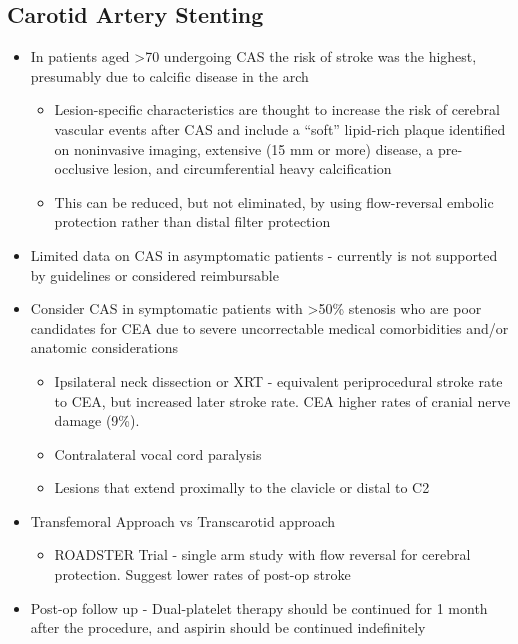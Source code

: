 \documentclass[
]{book}
\providecommand{\tightlist}{%
  \setlength{\itemsep}{0pt}\setlength{\parskip}{0pt}}
\begin{document}
\hypertarget{carotid-artery-stenting}{%
\subsection{Carotid Artery Stenting}\label{carotid-artery-stenting}}

\begin{itemize}
\item
  In patients aged \textgreater70 undergoing CAS the risk of stroke was the
  highest, presumably due to calcific disease in the arch

  \begin{itemize}
  \item
    Lesion-specific characteristics are thought to increase the risk
    of cerebral vascular events after CAS and include a ``soft''
    lipid-rich plaque identified on noninvasive imaging, extensive
    (15 mm or more) disease, a pre-occlusive lesion, and
    circumferential heavy calcification
  \item
    This can be reduced, but not eliminated, by using flow-reversal
    embolic protection rather than distal filter protection
  \end{itemize}
\item
  Limited data on CAS in asymptomatic patients - currently is not
  supported by guidelines or considered reimbursable
\item
  Consider CAS in symptomatic patients with \textgreater50\% stenosis who are poor
  candidates for CEA due to severe uncorrectable medical comorbidities
  and/or anatomic considerations

  \begin{itemize}
  \item
    Ipsilateral neck dissection or XRT - equivalent periprocedural
    stroke rate to CEA, but increased later stroke rate. CEA higher
    rates of cranial nerve damage (9\%).
    \citep{giannopoulosRevascularizationRadiationinducedCarotid2018}
  \item
    Contralateral vocal cord paralysis
  \item
    Lesions that extend proximally to the clavicle or distal to C2
  \end{itemize}
\item
  Transfemoral Approach vs Transcarotid approach

  \begin{itemize}
  \tightlist
  \item
    ROADSTER Trial - single arm study with flow reversal for
    cerebral protection. Suggest lower rates of post-op stroke
  \end{itemize}
\item
  Post-op follow up - Dual-platelet therapy should be continued for 1
  month after the procedure, and aspirin should be continued
  indefinitely


\end{itemize}
\end{document}
